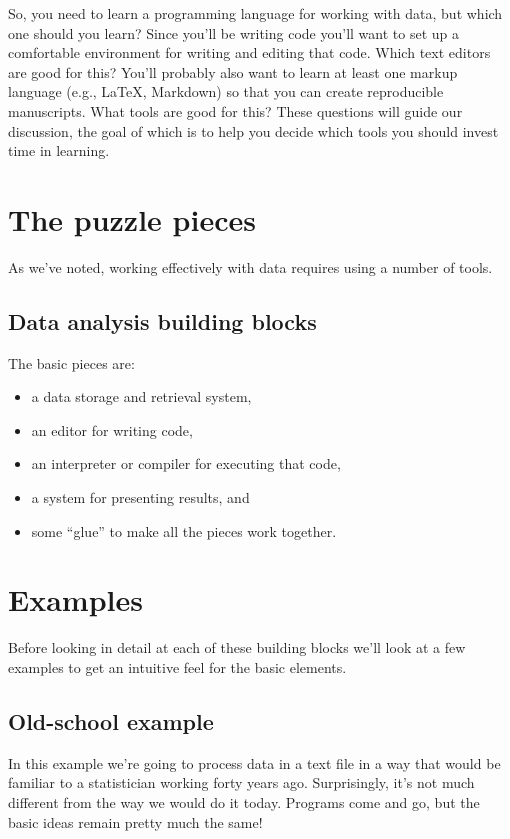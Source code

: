 \documentclass[]{book}
\providecommand{\tightlist}{%
  \setlength{\itemsep}{0pt}\setlength{\parskip}{0pt}}
\begin{document}
So, you need to learn a programming language for working with data, but
which one should you learn? Since you'll be writing code you'll want to
set up a comfortable environment for writing and editing that code.
Which text editors are good for this? You'll probably also want to learn
at least one markup language (e.g., LaTeX, Markdown) so that you can
create reproducible manuscripts. What tools are good for this? These
questions will guide our discussion, the goal of which is to help you
decide which tools you should invest time in learning.

\section{The puzzle pieces}\label{the-puzzle-pieces}

As we've noted, working effectively with data requires using a number of
tools.

\subsection{Data analysis building
blocks}\label{data-analysis-building-blocks}

The basic pieces are:

\begin{itemize}
\tightlist
\item
  a data storage and retrieval system,
\item
  an editor for writing code,
\item
  an interpreter or compiler for executing that code,
\item
  a system for presenting results, and
\item
  some ``glue'' to make all the pieces work together.
\end{itemize}

\section{Examples}\label{examples}

Before looking in detail at each of these building blocks we'll look at
a few examples to get an intuitive feel for the basic elements.

\subsection{Old-school example}\label{old-school-example}

In this example we're going to process data in a text file in a way that
would be familiar to a statistician working forty years ago.
Surprisingly, it's not much different from the way we would do it today.
Programs come and go, but the basic ideas remain pretty much the same!
\end{document}
